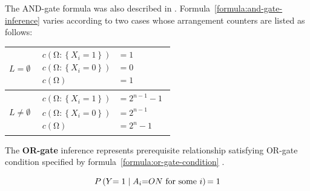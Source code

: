 \documentclass{article}
\numberwithin{equation}{section}
\numberwithin{figure}{section}
\numberwithin{table}{section}
\begin{document}
The AND-gate formula was also described in \cite[p.~33]{diez:pmodels}. Formula~\ref{formula:and-gate-inference} varies according to two cases whose arrangement counters are listed as follows:
\begin{center}
\begin{tabular}{l|l}
$L=\emptyset$ &
  $\begin{aligned}
  c\left(\mathrm{\Omega }:\left\{X_i=1\right\}\right)&=1\\
  c\left(\mathrm{\Omega }:\left\{X_i=0\right\}\right)&=0\\
  c\left(\mathrm{\Omega }\right)&=1
  \end{aligned}$\\
\hline
$L\neq \emptyset$ &
  $\begin{aligned}
  c\left(\mathrm{\Omega }:\left\{X_i=1\right\}\right)&=2^{n-1}-1\\
  c\left(\mathrm{\Omega }:\left\{X_i=0\right\}\right)&=2^{n-1}\\
  c\left(\mathrm{\Omega }\right)&=2^n-1
  \end{aligned}$\\
\end{tabular}
\end{center}
The \textbf{OR-gate} inference represents prerequisite relationship satisfying OR-gate condition specified by formula~\ref{formula:or-gate-condition} \cite[p.~157]{neapolitan:bn}.

\begin{equation}
P\left(Y\mathrm{=1}\mathrel{\left|\vphantom{Y\mathrm{=1} A_i\mathrm{=}ON\mathrm{\ for\ some\ }i}\right.\kern-\nulldelimiterspace}A_i\mathrm{=}ON\mathrm{\ for\ some\ }i\right)\mathrm{=1}
\label{formula:or-gate-condition}
\end{equation}
\end{document}
